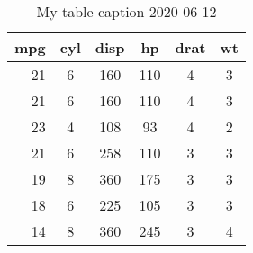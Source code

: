 \begin{table}[p]
\centering
\caption{My table caption 2020-06-12} 
\begin{tabular}{r|c|cccc}
  \hline
mpg & cyl & disp & hp & drat & wt \\ 
  \hline
21 & 6 & 160 & 110 & 4 & 3 \\ 
  21 & 6 & 160 & 110 & 4 & 3 \\ 
  23 & 4 & 108 & 93 & 4 & 2 \\ 
  21 & 6 & 258 & 110 & 3 & 3 \\ 
  19 & 8 & 360 & 175 & 3 & 3 \\ 
  18 & 6 & 225 & 105 & 3 & 3 \\ 
  14 & 8 & 360 & 245 & 3 & 4 \\ 
   \hline
\end{tabular}
\end{table}
